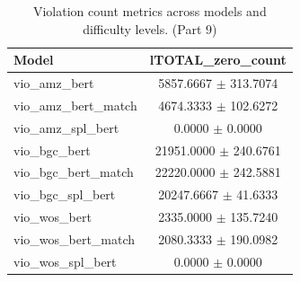 \begin{table}[htbp]
\centering
\small
\begin{tabular}{lc}
\toprule
Model & lTOTAL_zero\_count \\
\midrule
vio\_amz\_bert & 5857.6667 $\pm$ 313.7074 \\
vio\_amz\_bert\_match & 4674.3333 $\pm$ 102.6272 \\
vio\_amz\_spl\_bert & 0.0000 $\pm$ 0.0000 \\
vio\_bgc\_bert & 21951.0000 $\pm$ 240.6761 \\
vio\_bgc\_bert\_match & 22220.0000 $\pm$ 242.5881 \\
vio\_bgc\_spl\_bert & 20247.6667 $\pm$ 41.6333 \\
vio\_wos\_bert & 2335.0000 $\pm$ 135.7240 \\
vio\_wos\_bert\_match & 2080.3333 $\pm$ 190.0982 \\
vio\_wos\_spl\_bert & 0.0000 $\pm$ 0.0000 \\
\bottomrule
\end{tabular}
\caption{Violation count metrics across models and difficulty levels. (Part 9)}
\label{tab:vio_metrics_part9}
\end{table}